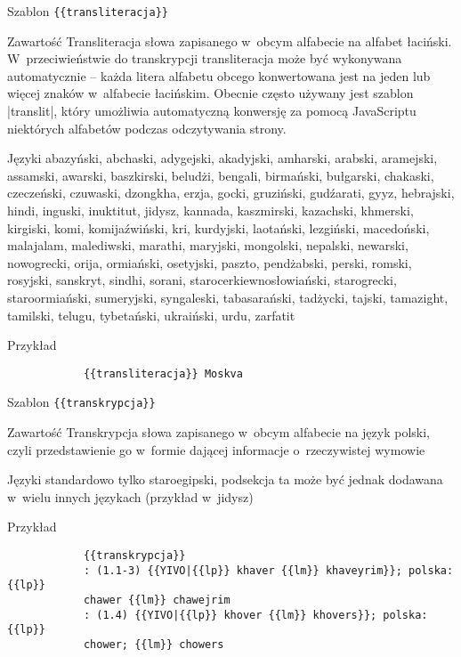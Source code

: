 \begin{opis}
	\item[Szablon] \verb|{{transliteracja}}|
	\item[Zawartość] Transliteracja słowa zapisanego w~obcym alfabecie na alfabet łaciński. \\ W~przeciwieństwie do transkrypcji transliteracja może być wykonywana automatycznie -- każda litera alfabetu obcego konwertowana jest na jeden lub więcej znaków w~alfabecie łacińskim. Obecnie często używany jest szablon \kod|{{translit}}|, który umożliwia automatyczną konwersję za pomocą JavaScriptu niektórych alfabetów podczas odczytywania strony.
	\item[Języki] abazyński, abchaski, adygejski, akadyjski, amharski, arabski, aramejski, assamski, awarski, baszkirski, beludżi, bengali, birmański, bułgarski, chakaski, czeczeński, czuwaski, dzongkha, erzja, gocki, gruziński, gudźarati, gyyz, hebrajski, hindi, inguski, inuktitut, jidysz, kannada, kaszmirski, kazachski, khmerski, kirgiski, komi, komi\dywiz{}jaźwiński, kri, kurdyjski, laotański, lezgiński, macedoński, malajalam, malediwski, marathi, maryjski, mongolski, nepalski, newarski, nowogrecki, orija, ormiański, osetyjski, paszto, pendżabski, perski, romski, rosyjski, sanskryt, sindhi, sorani, staro\dywiz{}cerkiewno\dywiz{}słowiański, starogrecki, staroormiański, sumeryjski, syngaleski, tabasarański, tadżycki, tajski, tamazight, tamilski, telugu, tybetański, ukraiński, urdu, zarfatit
	\item[Przykład]
		\begin{verbatim}
			{{transliteracja}} Moskva
		\end{verbatim}
\end{opis}
\spacer
\begin{opis}
	\item[Szablon] \verb|{{transkrypcja}}|
	\item[Zawartość] Transkrypcja słowa zapisanego w~obcym alfabecie na język polski, czyli przedstawienie go w~formie dającej informacje o~rzeczywistej wymowie
	\item[Języki] standardowo tylko staroegipski, podsekcja ta może być jednak dodawana w~wielu innych językach (przykład w~jidysz)
	\item[Przykład]
		\begin{verbatim}
			{{transkrypcja}}
			: (1.1-3) {{YIVO|{{lp}} khaver {{lm}} khaveyrim}}; polska: {{lp}}
			chawer {{lm}} chawejrim
			: (1.4) {{YIVO|{{lp}} khover {{lm}} khovers}}; polska: {{lp}}
			chower; {{lm}} chowers
		\end{verbatim}
\end{opis}
